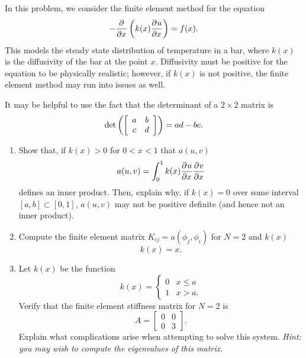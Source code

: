 In this problem, we consider the finite element method for the equation
\[
-\frac{\partial^{} }{\partial x^{}}\left(k(x)\frac{\partial^{} u}{\partial x^{}}\right) = f(x).
\]
This models the steady state distribution of temperature in a bar, where $k(x)$ is the diffusivity of the bar at the point $x$.  Diffusivity must be positive for the equation to be physically realistic; however, if $k(x)$ is not positive, the finite element method may run into issues as well.  

It may be helpful to use the fact that the determinant of a $2\times 2$ matrix is
\[
{\rm det}\left(\left[
\begin{array}{cc}
a &b\\
c &d
\end{array}
\right]\right) = ad-bc.
\]

\begin{enumerate}
\item Show that, if $k(x) > 0$ for $0 < x < 1$ that $a(u,v)$
\[
a(u,v) = \int_0^1 k(x)\frac{\partial^{} u}{\partial x^{}}\frac{\partial^{} v}{\partial x^{}}
\]
defines an inner product.  Then, explain why, if $k(x) = 0$ over some interval $[a,b] \subset [0,1]$, $a(u,v)$ may not be positive definite (and hence not an inner product).  
\item Compute the finite element matrix $K_{ij} = a(\phi_j,\phi_i)$ for $N = 2$ and $k(x)$ 
\[
k(x) = x.
\]
\item Let $k(x)$ be the function
\[
k(x) = \begin{cases}
0 & x \leq a\\
1 & x > a.
\end{cases}
\]
Verify that the finite element stiffness matrix for $N=2$ is
\[
A = \left[
\begin{array}{cc}
0 &0\\
0 &3
\end{array}
\right].
\]
Explain what complications arise when attempting to solve this system.  \emph{Hint: you may wish to compute the eigenvalues of this matrix.}
\end{enumerate}